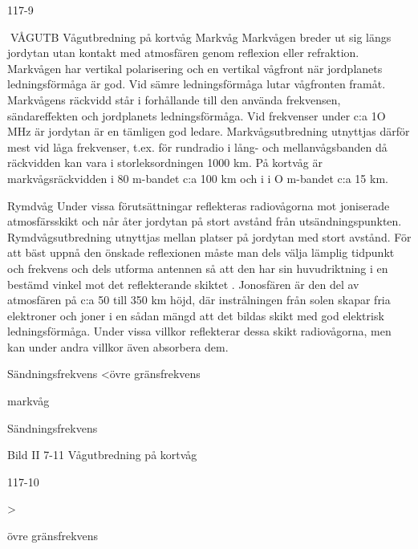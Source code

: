 117-9

VÅGUTB
Vågutbredning på kortvåg
Markvåg
Markvågen breder ut sig längs jordytan utan
kontakt med atmosfären genom reflexion
eller refraktion.
Markvågen har vertikal polarisering och
en vertikal vågfront när jordplanets ledningsförmåga är god. Vid sämre ledningsförmåga
lutar vågfronten framåt.
Markvågens räckvidd står i forhållande
till den använda frekvensen, sändareffekten
och jordplanets ledningsförmåga.
Vid frekvenser under c:a 1O MHz är jordytan är en tämligen god ledare. Markvågsutbredning utnyttjas därför mest vid låga
frekvenser, t.ex. för rundradio i lång- och
mellanvågsbanden då räckvidden kan vara
i storleksordningen 1000 km. På kortvåg är
markvågsräckvidden i 80 m-bandet c:a 100
km och i i O m-bandet c:a 15 km.

Rymdvåg
Under vissa förutsättningar reflekteras radiovågorna mot joniserade atmosfärsskikt
och når åter jordytan på stort avstånd från
utsändningspunkten. Rymdvågsutbredning
utnyttjas mellan platser på jordytan med stort
avstånd.
För att bäst uppnå den önskade reflexionen måste man dels välja lämplig tidpunkt
och frekvens och dels utforma antennen så
att den har sin huvudriktning i en bestämd
vinkel mot det reflekterande skiktet .
Jonosfären är den del av atmosfären på
c:a 50 till 350 km höjd, där instrålningen från
solen skapar fria elektroner och joner i en
sådan mängd att det bildas skikt med god
elektrisk ledningsförmåga. Under vissa villkor reflekterar dessa skikt radiovågorna, men
kan under andra villkor även absorbera dem.

Sändningsfrekvens <övre gränsfrekvens

markvåg

Sändningsfrekvens

Bild II 7-11 Vågutbredning på kortvåg

117-10

>

övre gränsfrekvens

